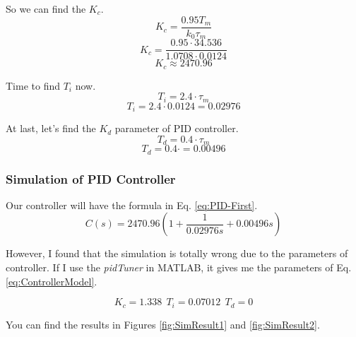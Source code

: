 \documentclass[11pt,a4paper,twocolumn]{article}
\begin{document}
So we can find the $K_c$.
\begin{equation}
    K_c = \frac{0.95 T_m}{k_0 \tau_m}
\end{equation}
\begin{equation*}
    K_c = \frac{0.95 \cdot 34.536}{1.0708 \cdot 0.0124}
\end{equation*}
\begin{equation*}
    K_c \approx 2470.96
\end{equation*}

Time to find $T_i$ now.
\begin{equation}
    T_i = 2.4 \cdot \tau_m
\end{equation}
\begin{equation*}
    T_i = 2.4 \cdot 0.0124 = 0.02976
\end{equation*}

At last, let's find the $K_d$ parameter of PID controller.
\begin{equation}
    T_d = 0.4 \cdot \tau_m
\end{equation}
\begin{equation*}
    T_d = 0.4 \cdot = 0.00496
\end{equation*}

\subsubsection{Simulation of PID Controller}
Our controller will have the formula in Eq. \eqref{eq:PID-First}.
\begin{equation}
    C(s) = 2470.96 \left(1 + \frac{1}{0.02976s} + 0.00496s\right)
    \label{eq:PID-First}
\end{equation}

However, I found that the simulation is totally wrong due to the parameters of controller. If I use the \textit{pidTuner} in MATLAB, it gives me the parameters of Eq. \eqref{eq:ControllerModel}.

\begin{equation}
    K_c = 1.338\ \ T_i = 0.07012\ \ T_d = 0
    \label{eq:ControllerModel}
\end{equation}

You can find the results in Figures \ref{fig:SimResult1} and \ref{fig:SimResult2}.
\end{document}
